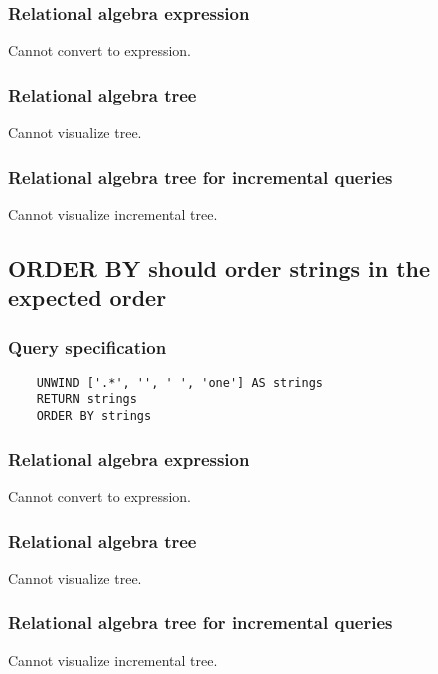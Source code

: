 	\subsubsection*{Relational algebra expression}

	Cannot convert to expression.

	\subsubsection*{Relational algebra tree}

	Cannot visualize tree.

	\subsubsection*{Relational algebra tree for incremental queries}

	Cannot visualize incremental tree.
	\subsection{ORDER BY should order strings in the expected order}

	\subsubsection*{Query specification}

	\begin{lstlisting}
	UNWIND ['.*', '', ' ', 'one'] AS strings
	RETURN strings
	ORDER BY strings
	\end{lstlisting}


	\subsubsection*{Relational algebra expression}

	Cannot convert to expression.

	\subsubsection*{Relational algebra tree}

	Cannot visualize tree.

	\subsubsection*{Relational algebra tree for incremental queries}

	Cannot visualize incremental tree.

